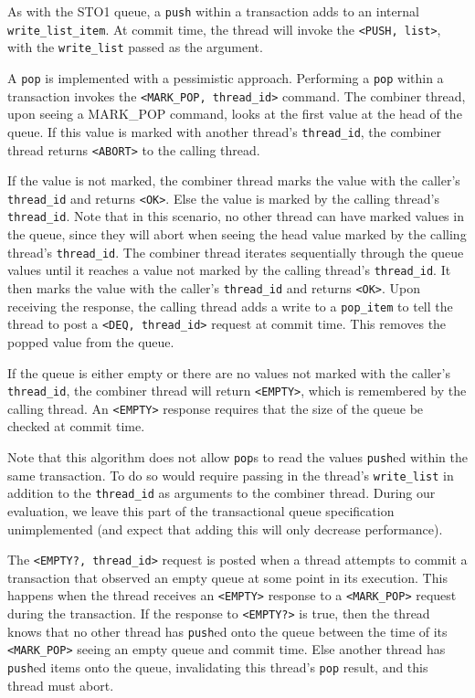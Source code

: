 As with the STO1 queue, a \texttt{push} within a transaction adds to an internal \texttt{write\_list\_item}. At commit time, the thread will invoke the \texttt{<PUSH, list>}, with the \texttt{write\_list} passed as the argument.

A \texttt{pop} is implemented with a pessimistic approach. Performing a \texttt{pop} within a transaction invokes the \texttt{<MARK\_POP, thread\_id>} command. The combiner thread, upon seeing a MARK\_POP command, looks at the first value at the head of the queue. If this value is marked with another thread's \texttt{thread\_id}, the combiner thread returns \texttt{<ABORT>} to the calling thread.

If the value is not marked, the combiner thread marks the value with the caller's \texttt{thread\_id} and returns \texttt{<OK>}. Else the value is marked by the calling thread's \texttt{thread\_id}. Note that in this scenario, no other thread can have marked values in the queue, since they will abort when seeing the head value marked by the calling thread's \texttt{thread\_id}. The combiner thread iterates sequentially through the queue values until it reaches a value not marked by the calling thread's \texttt{thread\_id}. It then marks the value with the caller's \texttt{thread\_id} and returns \texttt{<OK>}. Upon receiving the response, the calling thread adds a write to a \texttt{pop\_item} to tell the thread to post a \texttt{<DEQ, thread\_id>} request at commit time. This removes the popped value from the queue.

If the queue is either empty or there are no values not marked with the caller's \texttt{thread\_id}, the combiner thread will return \texttt{<EMPTY>}, which is remembered by the calling thread. An \texttt{<EMPTY>} response requires that the size of the queue be checked at commit time.

Note that this algorithm does not allow \texttt{pop}s to read the values \texttt{push}ed within the same transaction. To do so would require passing in the thread's \texttt{write\_list} in addition to the \texttt{thread\_id} as arguments to the combiner thread. During our evaluation, we leave this part of the transactional queue specification unimplemented (and expect that adding this will only decrease performance).

The \texttt{<EMPTY?, thread\_id>} request is posted when a thread attempts to commit a transaction that observed an empty queue at some point in its execution. This happens when the thread receives an \texttt{<EMPTY>} response to a \texttt{<MARK\_POP>} request during the transaction. If the response to \texttt{<EMPTY?>} is true, then the thread knows that no other thread has \texttt{push}ed onto the queue between the time of its \texttt{<MARK\_POP>} seeing an empty queue and commit time. Else another thread has \texttt{push}ed items onto the queue, invalidating this thread's \texttt{pop} result, and this thread must abort.

